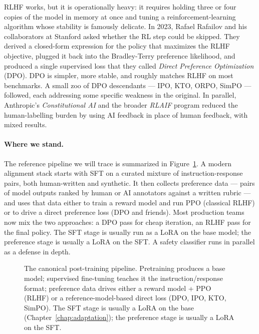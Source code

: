 RLHF works, but it is operationally heavy: it requires holding
three or four copies of the model in memory at once and tuning a
reinforcement-learning algorithm whose stability is famously
delicate. In 2023, Rafael Rafailov and his collaborators at Stanford
asked whether the RL step could be skipped. They derived a
closed-form expression for the policy that maximizes the RLHF
objective, plugged it back into the Bradley-Terry preference
likelihood, and produced a single supervised loss that they called
\emph{Direct Preference Optimization} (DPO). DPO is simpler, more
stable, and roughly matches RLHF on most benchmarks. A small zoo of
DPO descendants --- IPO, KTO, ORPO, SimPO --- followed, each
addressing some specific weakness in the original. In parallel,
Anthropic's \emph{Constitutional AI} and the broader \emph{RLAIF}
program reduced the human-labelling burden by using AI feedback in
place of human feedback, with mixed results.

\paragraph{Where we stand.}
The reference pipeline we will trace is summarized in
Figure~\ref{fig:rlhf-pipeline}. A modern alignment stack starts with
SFT on a curated mixture of instruction-response pairs, both
human-written and synthetic. It then collects preference data ---
pairs of model outputs ranked by human or AI annotators against a
written rubric --- and uses that data either to train a reward
model and run PPO (classical RLHF) or to drive a direct preference
loss (DPO and friends). Most production teams now mix the two
approaches: a DPO pass for cheap iteration, an RLHF pass for the
final policy. The SFT stage is usually run as a LoRA on the base
model; the preference stage is usually a LoRA on the SFT. A safety
classifier runs in parallel as a defense in depth.

\begin{figure}[ht]
  \centering
  
  \caption{The canonical post-training pipeline. Pretraining produces
  a base model; supervised fine-tuning teaches it the instruction/response
  format; preference data drives either a reward model + PPO (RLHF) or a
  reference-model-based direct loss (DPO, IPO, KTO, SimPO). The SFT
  stage is usually a LoRA on the base (Chapter~\ref{chap:adaptation}); the preference stage
  is usually a LoRA on the SFT.}
  \label{fig:rlhf-pipeline}
\end{figure}

